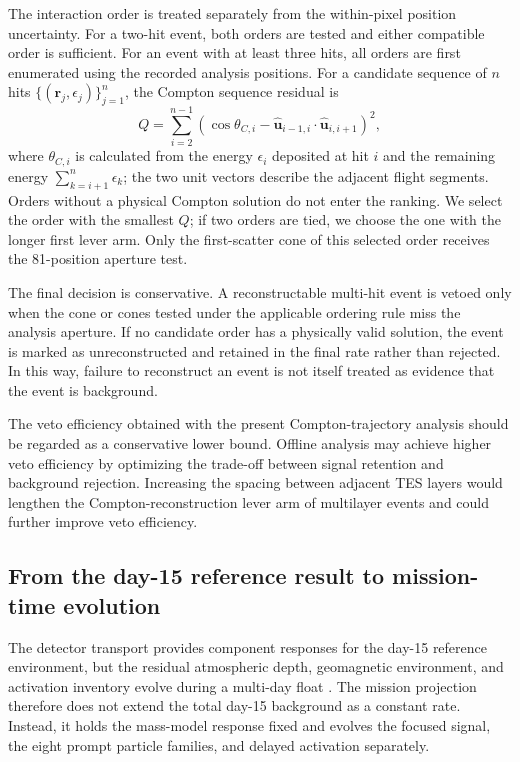\documentclass[11pt]{article}
\begin{document}
The interaction order is treated separately from the within-pixel position
uncertainty. For a two-hit event, both orders are tested and either compatible
order is sufficient. For an event with at least three hits, all orders are first
enumerated using the recorded analysis positions. For a candidate sequence of
$n$ hits $\{(\mathbf r_j,\epsilon_j)\}_{j=1}^{n}$, the Compton sequence residual
is
\begin{equation}
 Q=\sum_{i=2}^{n-1}\left(\cos\theta_{C,i}-
 \hat{\mathbf u}_{i-1,i}\!\cdot\!\hat{\mathbf u}_{i,i+1}\right)^2,
\end{equation}
where $\theta_{C,i}$ is calculated from the energy $\epsilon_i$ deposited at
hit $i$ and the remaining energy $\sum_{k=i+1}^{n}\epsilon_k$; the two unit
vectors describe the adjacent flight segments. Orders without a physical
Compton solution do not enter the ranking. We select the order with the smallest
$Q$; if two orders are tied, we choose the one with the longer first lever arm.
Only the first-scatter cone of this selected order receives the 81-position
aperture test.

The final decision is conservative. A reconstructable multi-hit event is vetoed
only when the cone or cones tested under the applicable ordering rule miss the
analysis aperture. If no candidate order has a physically valid solution, the
event is marked as unreconstructed and retained in the final rate rather than
rejected. In this way, failure to reconstruct an event is not itself treated as
evidence that the event is background.

The veto efficiency obtained with the present Compton-trajectory analysis should be regarded as a conservative lower bound. Offline analysis may achieve higher veto efficiency by optimizing the trade-off between signal retention and background rejection. Increasing the spacing between adjacent TES layers would lengthen the Compton-reconstruction lever arm of multilayer events and could further improve veto efficiency.

\subsection{From the day-15 reference result to mission-time evolution}
\label{sec:mission_time_fold}

The detector transport provides component responses for the day-15 reference
environment, but the residual atmospheric depth, geomagnetic environment, and
activation inventory evolve during a multi-day float
\cite{Gallego2025Balloon,Kierans2017}. The mission projection therefore does not
extend the total day-15 background as a constant rate. Instead, it holds the
mass-model response fixed and evolves the focused signal, the eight prompt
particle families, and delayed activation separately.
\end{document}
